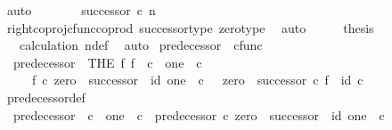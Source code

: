 \begin{isabellebody}
\ auto\isanewline
\ \ \isamarkupfalse%
\ \isamarkupfalse%
\ {\isachardoublequoteopen}{\isachardot}{\kern0pt}{\isachardot}{\kern0pt}{\isachardot}{\kern0pt}\ {\isacharequal}{\kern0pt}\ successor\ {\isasymcirc}\isactrlsub c\ n{\isachardoublequoteclose}\isanewline
\ \ \ \ \isamarkupfalse%
\ right{\isacharunderscore}{\kern0pt}coproj{\isacharunderscore}{\kern0pt}cfunc{\isacharunderscore}{\kern0pt}coprod\ successor{\isacharunderscore}{\kern0pt}type\ zero{\isacharunderscore}{\kern0pt}type\ \isamarkupfalse%
\ auto\isanewline
\ \ \isamarkupfalse%
\ \isamarkupfalse%
\ {\isacharquery}{\kern0pt}thesis\isanewline
\ \ \ \ \isamarkupfalse%
\ \ \ calculation\ n{\isacharunderscore}{\kern0pt}def\ \isamarkupfalse%
\ auto\isanewline
{}\isamarkupfalse%
%
\endisatagproof
{\isafoldproof}%
%
\isadelimproof
%
\endisadelimproof
%
\isadelimdocument
%
\endisadelimdocument
%
\isatagdocument
%
\isamarkuptrue%
%
\endisatagdocument
{\isafolddocument}%
%
\isadelimdocument
%
\endisadelimdocument
{}\isamarkupfalse%
\ predecessor\ {\isacharcolon}{\kern0pt}{\isacharcolon}{\kern0pt}\ {\isachardoublequoteopen}cfunc{\isachardoublequoteclose}\ \isanewline
\ \ {\isachardoublequoteopen}predecessor\ {\isacharequal}{\kern0pt}\ {\isacharparenleft}{\kern0pt}THE\ f{\isachardot}{\kern0pt}\ f\ {\isacharcolon}{\kern0pt}\ {\isasymnat}\isactrlsub c\ {\isasymrightarrow}\ one\ {\isasymCoprod}\ {\isasymnat}\isactrlsub c\ \isanewline
\ \ \ \ {\isasymand}\ f\ {\isasymcirc}\isactrlsub c\ {\isacharparenleft}{\kern0pt}zero\ {\isasymamalg}\ successor{\isacharparenright}{\kern0pt}\ {\isacharequal}{\kern0pt}\ id\ {\isacharparenleft}{\kern0pt}one\ {\isasymCoprod}\ {\isasymnat}\isactrlsub c{\isacharparenright}{\kern0pt}\ {\isasymand}\ \ {\isacharparenleft}{\kern0pt}zero\ {\isasymamalg}\ successor{\isacharparenright}{\kern0pt}\ {\isasymcirc}\isactrlsub c\ f\ {\isacharequal}{\kern0pt}\ id\ {\isasymnat}\isactrlsub c{\isacharparenright}{\kern0pt}{\isachardoublequoteclose}\isanewline
\isanewline
{}\isamarkupfalse%
\ predecessor{\isacharunderscore}{\kern0pt}def{}{\isacharcolon}{\kern0pt}\isanewline
\ \ {\isachardoublequoteopen}predecessor\ {\isacharcolon}{\kern0pt}\ {\isasymnat}\isactrlsub c\ {\isasymrightarrow}\ one\ {\isasymCoprod}\ {\isasymnat}\isactrlsub c\ {\isasymand}\ predecessor\ {\isasymcirc}\isactrlsub c\ {\isacharparenleft}{\kern0pt}zero\ {\isasymamalg}\ successor{\isacharparenright}{\kern0pt}\ {\isacharequal}{\kern0pt}\ id\ {\isacharparenleft}{\kern0pt}one\ {\isasymCoprod}\ {\isasymnat}\isactrlsub c{\isacharparenright}{\kern0pt}\isanewline

\end{isabellebody}
